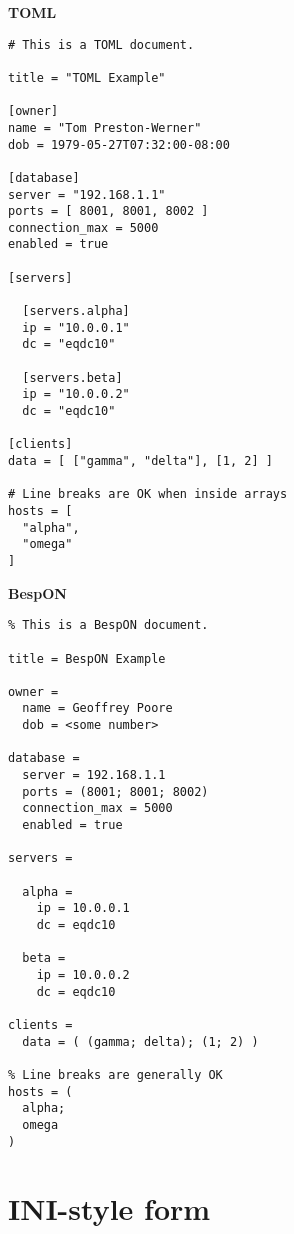 \documentclass[11pt]{article}
\begin{document}
\begin{appendices}
\begin{tcolorbox}{}
\begin{multicols}{2}

\centering \textbf{TOML}
\begin{Verbatim}[formatcom=\color{DarkGreen}]
# This is a TOML document.

title = "TOML Example"

[owner]
name = "Tom Preston-Werner"
dob = 1979-05-27T07:32:00-08:00

[database]
server = "192.168.1.1"
ports = [ 8001, 8001, 8002 ]
connection_max = 5000
enabled = true

[servers]

  [servers.alpha]
  ip = "10.0.0.1"
  dc = "eqdc10"

  [servers.beta]
  ip = "10.0.0.2"
  dc = "eqdc10"

[clients]
data = [ ["gamma", "delta"], [1, 2] ]

# Line breaks are OK when inside arrays
hosts = [
  "alpha",
  "omega"
]
\end{Verbatim}
\columnbreak
\centering \textbf{BespON}

\begin{Verbatim}
% This is a BespON document.

title = BespON Example

owner =
  name = Geoffrey Poore
  dob = <some number>

database =
  server = 192.168.1.1
  ports = (8001; 8001; 8002)
  connection_max = 5000
  enabled = true

servers =

  alpha = 
    ip = 10.0.0.1
    dc = eqdc10

  beta =
    ip = 10.0.0.2
    dc = eqdc10

clients =
  data = ( (gamma; delta); (1; 2) )

% Line breaks are generally OK
hosts = (
  alpha;
  omega
)
\end{Verbatim}
\end{multicols}
\end{tcolorbox}



\section{INI-style form}




\begin{tcolorbox}{}
\begin{multicols}{2}


\end{multicols}
\end{tcolorbox}
\end{appendices}
\end{document}
